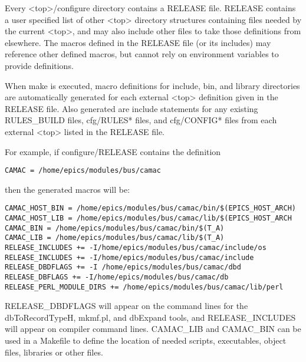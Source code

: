 Every \textless{}top\textgreater{}/configure directory contains a RELEASE file. RELEASE contains a user specified list of other \textless{}top\textgreater{} 
directory structures containing files needed by the current \textless{}top\textgreater{}, and may also include other files to take those definitions 
from elsewhere. The macros defined in the RELEASE file (or its includes) may reference other defined macros, but 
cannot rely on environment variables to provide definitions.

When make is executed, macro definitions for include, bin, and library directories are automatically generated for each 
external \textless{}top\textgreater{} definition given in the RELEASE file. Also generated are include statements for any existing 
RULES\_BUILD files, cfg/RULES* files, and cfg/CONFIG* files from each external \textless{}top\textgreater{} listed in the RELEASE file.

For example, if configure/RELEASE contains the definition
\begin{verbatim}
CAMAC = /home/epics/modules/bus/camac
\end{verbatim}
then the generated macros will be:
\begin{verbatim}
CAMAC_HOST_BIN = /home/epics/modules/bus/camac/bin/$(EPICS_HOST_ARCH)
CAMAC_HOST_LIB = /home/epics/modules/bus/camac/lib/$(EPICS_HOST_ARCH
CAMAC_BIN = /home/epics/modules/bus/camac/bin/$(T_A)
CAMAC_LIB = /home/epics/modules/bus/camac/lib/$(T_A)
RELEASE_INCLUDES += -I/home/epics/modules/bus/camac/include/os
RELEASE_INCLUDES += -I/home/epics/modules/bus/camac/include
RELEASE_DBDFLAGS += -I /home/epics/modules/bus/camac/dbd
RELEASE_DBFLAGS += -I/home/epics/modules/bus/camac/db
RELEASE_PERL_MODULE_DIRS += /home/epics/modules/bus/camac/lib/perl
\end{verbatim}


RELEASE\_DBDFLAGS will appear on the command lines for the dbToRecordTypeH, mkmf.pl, and dbExpand tools, 
and RELEASE\_INCLUDES will appear on compiler command lines. CAMAC\_LIB and CAMAC\_BIN can be used in a 
Makefile to define the location of needed scripts, executables, object files, libraries or other files.

